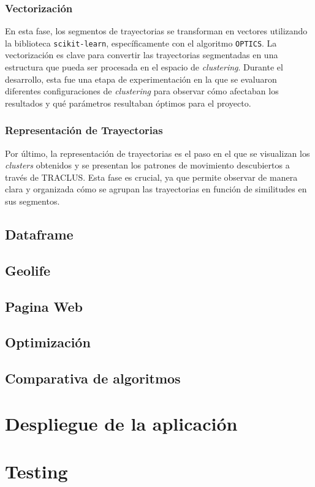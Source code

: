 \subsubsection{Vectorización}

En esta fase, los segmentos de trayectorias se transforman en vectores utilizando la biblioteca \texttt{scikit-learn}, específicamente con el algoritmo \texttt{OPTICS}. La vectorización es clave para convertir las trayectorias segmentadas en una estructura que pueda ser procesada en el espacio de \textit{clustering}. Durante el desarrollo, esta fue una etapa de experimentación en la que se evaluaron diferentes configuraciones de \textit{clustering} para observar cómo afectaban los resultados y qué parámetros resultaban óptimos para el proyecto.

\subsubsection{Representación de Trayectorias}

Por último, la representación de trayectorias es el paso en el que se visualizan los \textit{clusters} obtenidos y se presentan los patrones de movimiento descubiertos a través de TRACLUS. Esta fase es crucial, ya que permite observar de manera clara y organizada cómo se agrupan las trayectorias en función de similitudes en sus segmentos.

\subsection{Dataframe}
\subsection{Geolife}
\subsection{Pagina Web}
\subsection{Optimización}
\subsection{Comparativa de algoritmos}

\section{Despliegue de la aplicación}

\section{Testing}
